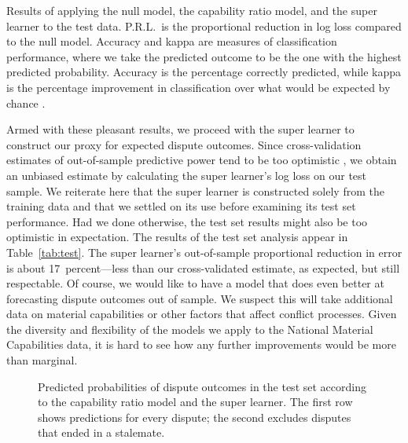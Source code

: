 \begin{table}[tp]
  \centering
  
  \caption{
    Results of applying the null model, the capability ratio model, and the super learner to the test data.
    P.R.L.\ is the proportional reduction in log loss compared to the null model.
    Accuracy and kappa are measures of classification performance, where we take the predicted outcome to be the one with the highest predicted probability.
    Accuracy is the percentage correctly predicted, while kappa is the percentage improvement in classification over what would be expected by chance \citep{Carletta:1996uk}.
  }
  \label{tab:test}
\end{table}

Armed with these pleasant results, we proceed with the super learner to construct our proxy for expected dispute outcomes.
Since cross-validation estimates of out-of-sample predictive power tend to be too optimistic \citep{Tibshirani:2009tz}, we obtain an unbiased estimate by calculating the super learner's log loss on our test sample.
We reiterate here that the super learner is constructed solely from the training data and that we settled on its use before examining its test set performance.
Had we done otherwise, the test set results might also be too optimistic in expectation.
The results of the test set analysis appear in Table~\ref{tab:test}.
The super learner's out-of-sample proportional reduction in error is about 17~percent---less than our cross-validated estimate, as expected, but still respectable.
Of course, we would like to have a model that does even better at forecasting dispute outcomes out of sample.
We suspect this will take additional data on material capabilities or other factors that affect conflict processes.
Given the diversity and flexibility of the models we apply to the National Material Capabilities data, it is hard to see how any further improvements would be more than marginal.

\begin{figure}[tp]
  \centering
  
  \vspace{-6em}
  \caption{
    Predicted probabilities of dispute outcomes in the test set according to the capability ratio model and the super learner.
    The first row shows predictions for every dispute; the second excludes disputes that ended in a stalemate.
  }
  \label{fig:tern}
\end{figure}

